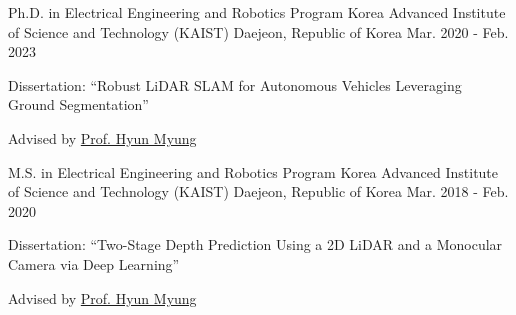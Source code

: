 

\begin{cventries}
%
%
  \cventry
  {Ph.D. in Electrical Engineering and Robotics Program} %
  {Korea Advanced Institute of Science and Technology (KAIST)} %
  {Daejeon, Republic of Korea} %
  {Mar. 2020 - Feb. 2023} %
  {
    \begin{cvitems} %
      \item {Dissertation: ``Robust LiDAR SLAM for Autonomous Vehicles Leveraging Ground Segmentation''}
      \item {Advised by \href{https://urobot.kaist.ac.kr/url_teams/prof-hyunmyung/}{Prof. Hyun Myung}}
    \end{cvitems}
  }

  \cventry
  {M.S. in Electrical Engineering and Robotics Program} %
  {Korea Advanced Institute of Science and Technology (KAIST)} %
  {Daejeon, Republic of Korea} %
  {Mar. 2018 - Feb. 2020} %
  {
    \begin{cvitems} %
      \item {Dissertation: ``Two-Stage Depth Prediction Using a 2D LiDAR and a Monocular Camera via Deep Learning''}
      \item {Advised by \href{https://urobot.kaist.ac.kr/url_teams/prof-hyunmyung/}{Prof. Hyun Myung}}
    \end{cvitems}
  }


\end{cventries}
